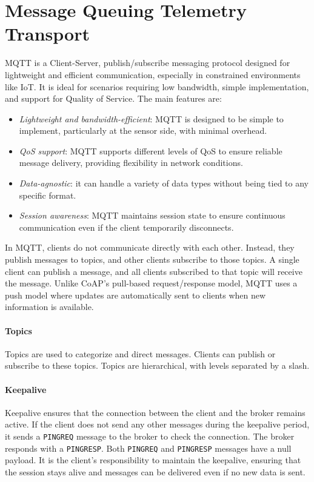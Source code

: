 \section{Message Queuing Telemetry Transport}

MQTT is a Client-Server, publish/subscribe messaging protocol designed for lightweight and efficient communication, especially in constrained environments like IoT. 
It is ideal for scenarios requiring low bandwidth, simple implementation, and support for Quality of Service.
The main features are: 
\begin{itemize}
    \item \textit{Lightweight and bandwidth-efficient}: MQTT is designed to be simple to implement, particularly at the sensor side, with minimal overhead.
    \item \textit{QoS support}: MQTT supports different levels of QoS to ensure reliable message delivery, providing flexibility in network conditions.
    \item \textit{Data-agnostic}: it can handle a variety of data types without being tied to any specific format.
    \item \textit{Session awareness}: MQTT maintains session state to ensure continuous communication even if the client temporarily disconnects.
\end{itemize}
In MQTT, clients do not communicate directly with each other. Instead, they publish messages to topics, and other clients subscribe to those topics.
A single client can publish a message, and all clients subscribed to that topic will receive the message.
Unlike CoAP's pull-based request/response model, MQTT uses a push model where updates are automatically sent to clients when new information is available.

\paragraph*{Topics}
Topics are used to categorize and direct messages. 
Clients can publish or subscribe to these topics.
Topics are hierarchical, with levels separated by a slash.

\paragraph*{Keepalive}
Keepalive ensures that the connection between the client and the broker remains active. 
If the client does not send any other messages during the keepalive period, it sends a \texttt{PINGREQ} message to the broker to check the connection. 
The broker responds with a \texttt{PINGRESP}.
Both \texttt{PINGREQ} and \texttt{PINGRESP} messages have a null payload.
It is the client's responsibility to maintain the keepalive, ensuring that the session stays alive and messages can be delivered even if no new data is sent.

